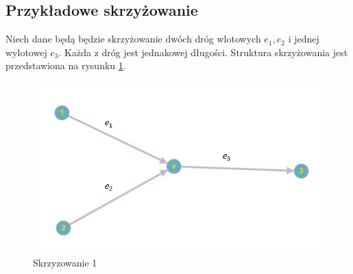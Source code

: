 \documentclass[12pt]{book}
\newcommand\addtag{\refstepcounter{equation}
\tag{\theequation}}
\begin{document}
\subsection{Przykładowe skrzyżowanie}
Niech dane będą będzie skrzyżowanie dwóch dróg wlotowych $e_1,e_2$ i jednej wylotowej $e_3$. Każda z dróg jest jednakowej długości. Struktura skrzyżowania jest przedstawiona na rysunku \ref{fig:skrz_1}.
\begin{figure}[H]
  \centering
    \includegraphics[width=14cm]{skrz_1}
 \caption{Skrzyzowanie 1}
 \label{fig:skrz_1}
\end{figure}

\end{document}
